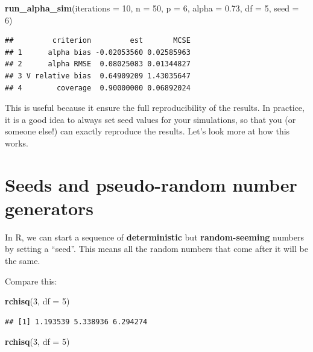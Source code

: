 \documentclass[
]{book}
\newenvironment{Shaded}{\begin{snugshade}}{\end{snugshade}}
\newcommand{\AttributeTok}[1]{\textcolor[rgb]{0.13,0.29,0.53}{#1}}
\newcommand{\DecValTok}[1]{\textcolor[rgb]{0.00,0.00,0.81}{#1}}
\newcommand{\FloatTok}[1]{\textcolor[rgb]{0.00,0.00,0.81}{#1}}
\newcommand{\FunctionTok}[1]{\textcolor[rgb]{0.13,0.29,0.53}{\textbf{#1}}}
\newcommand{\NormalTok}[1]{#1}
\begin{document}
\begin{Shaded}
\begin{Highlighting}[]
\FunctionTok{run\_alpha\_sim}\NormalTok{(}\AttributeTok{iterations =} \DecValTok{10}\NormalTok{, }\AttributeTok{n =} \DecValTok{50}\NormalTok{, }\AttributeTok{p =} \DecValTok{6}\NormalTok{, }\AttributeTok{alpha =} \FloatTok{0.73}\NormalTok{, }\AttributeTok{df =} \DecValTok{5}\NormalTok{, }
              \AttributeTok{seed =} \DecValTok{6}\NormalTok{)}
\end{Highlighting}
\end{Shaded}

\begin{verbatim}
##         criterion         est       MCSE
## 1      alpha bias -0.02053560 0.02585963
## 2      alpha RMSE  0.08025083 0.01344827
## 3 V relative bias  0.64909209 1.43035647
## 4        coverage  0.90000000 0.06892024
\end{verbatim}

This is useful because it ensure the full reproducibility of the results. In practice, it is a good idea to always set seed values for your simulations, so that you (or someone else!) can exactly reproduce the results.
Let's look more at how this works.

\section{Seeds and pseudo-random number generators}\label{seeds-and-pseudo-random-number-generators}

In R, we can start a sequence of \textbf{deterministic} but \textbf{random-seeming} numbers by setting a ``seed''.
This means all the random numbers that come after it will be the same.

Compare this:

\begin{Shaded}
\begin{Highlighting}[]
\FunctionTok{rchisq}\NormalTok{(}\DecValTok{3}\NormalTok{, }\AttributeTok{df =} \DecValTok{5}\NormalTok{)}
\end{Highlighting}
\end{Shaded}

\begin{verbatim}
## [1] 1.193539 5.338936 6.294274
\end{verbatim}

\begin{Shaded}
\begin{Highlighting}[]
\FunctionTok{rchisq}\NormalTok{(}\DecValTok{3}\NormalTok{, }\AttributeTok{df =} \DecValTok{5}\NormalTok{)}
\end{Highlighting}
\end{Shaded}
\end{document}
